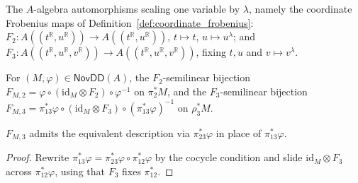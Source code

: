 \begin{definition}
  \label{def:face_frobenius}
  \leanok
  The $A$-algebra automorphisms scaling one variable by $\lambda$, namely the
  coordinate Frobenius maps of Definition~\ref{def:coordinate_frobenius}:
  $F_2 \colon A((t^{\mathbb{R}}, u^{\mathbb{R}})) \to A((t^{\mathbb{R}}, u^{\mathbb{R}}))$,
  $t \mapsto t$, $u \mapsto u^\lambda$; and
  $F_3 \colon A((t^{\mathbb{R}}, u^{\mathbb{R}}, v^{\mathbb{R}})) \to
  A((t^{\mathbb{R}}, u^{\mathbb{R}}, v^{\mathbb{R}}))$, fixing $t, u$ and $v \mapsto v^\lambda$.
\end{definition}

\begin{definition}
  \label{def:face_frobenius_action}
  \leanok
  For $(M, \varphi) \in \mathsf{NovDD}(A)$, the $F_2$-semilinear bijection
  $F_{M,2} = \varphi \circ (\mathrm{id}_M \otimes F_2) \circ \varphi^{-1}$
  on $\pi_2^\ast M$, and the $F_3$-semilinear bijection
  $F_{M,3} = \pi_{13}^\ast\varphi \circ (\mathrm{id}_M \otimes F_3)
  \circ (\pi_{13}^\ast\varphi)^{-1}$ on $\rho_3^\ast M$.
\end{definition}

\begin{lemma}
  \label{lem:fm3_cocycle}
  \leanok
  $F_{M,3}$ admits the equivalent description via $\pi_{23}^\ast\varphi$ in place
  of $\pi_{13}^\ast\varphi$.
\end{lemma}

\begin{proof}
  \leanok
  Rewrite $\pi_{13}^\ast\varphi = \pi_{23}^\ast\varphi \circ \pi_{12}^\ast\varphi$
  by the cocycle condition and slide $\mathrm{id}_M \otimes F_3$ across
  $\pi_{12}^\ast\varphi$, using that $F_3$ fixes $\pi_{12}^\ast$.
\end{proof}

